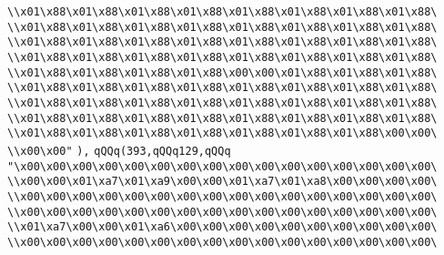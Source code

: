 \verb|\\x01\x88\x01\x88\x01\x88\x01\x88\x01\x88\x01\x88\x01\x88\x01\x88\|\newline
\verb|\\x01\x88\x01\x88\x01\x88\x01\x88\x01\x88\x01\x88\x01\x88\x01\x88\|\newline
\verb|\\x01\x88\x01\x88\x01\x88\x01\x88\x01\x88\x01\x88\x01\x88\x01\x88\|\newline
\verb|\\x01\x88\x01\x88\x01\x88\x01\x88\x01\x88\x01\x88\x01\x88\x01\x88\|\newline
\verb|\\x01\x88\x01\x88\x01\x88\x01\x88\x00\x00\x01\x88\x01\x88\x01\x88\|\newline
\verb|\\x01\x88\x01\x88\x01\x88\x01\x88\x01\x88\x01\x88\x01\x88\x01\x88\|\newline
\verb|\\x01\x88\x01\x88\x01\x88\x01\x88\x01\x88\x01\x88\x01\x88\x01\x88\|\newline
\verb|\\x01\x88\x01\x88\x01\x88\x01\x88\x01\x88\x01\x88\x01\x88\x01\x88\|\newline
\verb|\\x01\x88\x01\x88\x01\x88\x01\x88\x01\x88\x01\x88\x01\x88\x00\x00\|\newline
\verb|\\x00\x00"|\newline
\verb|),|\newline
\verb|qQQq(393,qQQq129,qQQq|\newline
\verb|"\x00\x00\x00\x00\x00\x00\x00\x00\x00\x00\x00\x00\x00\x00\x00\x00\|\newline
\verb|\\x00\x00\x01\xa7\x01\xa9\x00\x00\x01\xa7\x01\xa8\x00\x00\x00\x00\|\newline
\verb|\\x00\x00\x00\x00\x00\x00\x00\x00\x00\x00\x00\x00\x00\x00\x00\x00\|\newline
\verb|\\x00\x00\x00\x00\x00\x00\x00\x00\x00\x00\x00\x00\x00\x00\x00\x00\|\newline
\verb|\\x01\xa7\x00\x00\x01\xa6\x00\x00\x00\x00\x00\x00\x00\x00\x00\x00\|\newline
\verb|\\x00\x00\x00\x00\x00\x00\x00\x00\x00\x00\x00\x00\x00\x00\x00\x00\|\newline
